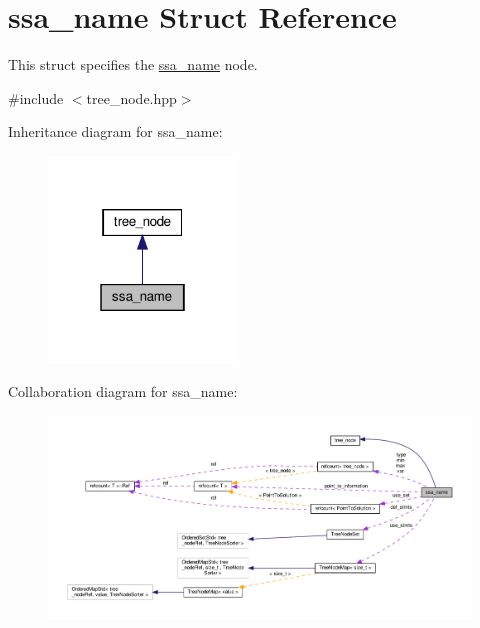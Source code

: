 \hypertarget{structssa__name}{}\section{ssa\+\_\+name Struct Reference}
\label{structssa__name}


This struct specifies the \hyperlink{structssa__name}{ssa\+\_\+name} node.  




{\ttfamily \#include $<$tree\+\_\+node.\+hpp$>$}



Inheritance diagram for ssa\+\_\+name\+:
\nopagebreak
\begin{figure}[H]
\begin{center}
\leavevmode
\includegraphics[width=142pt]{d6/d08/structssa__name__inherit__graph}
\end{center}
\end{figure}


Collaboration diagram for ssa\+\_\+name\+:
\nopagebreak
\begin{figure}[H]
\begin{center}
\leavevmode
\includegraphics[width=350pt]{d8/dec/structssa__name__coll__graph}
\end{center}
\end{figure}
